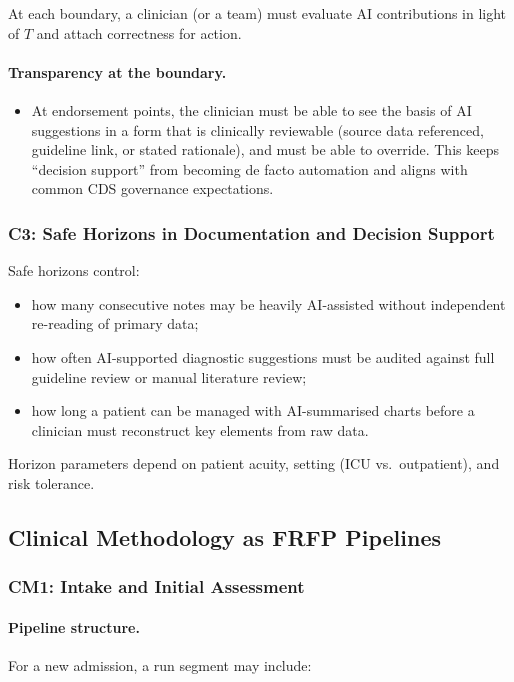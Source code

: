 At each boundary, a clinician (or a team) must evaluate AI contributions in
light of $T$ and attach correctness for action.
\paragraph{Transparency at the boundary.}
\begin{itemize}
  \item At endorsement points, the clinician must be able to see the basis of AI suggestions in a form that is
        clinically reviewable (source data referenced, guideline link, or stated rationale), and must be able to
        override. This keeps “decision support” from becoming de facto automation and aligns with common CDS governance
        expectations.
\end{itemize}
\subsubsection*{C3: Safe Horizons in Documentation and Decision Support}

Safe horizons control:

\begin{itemize}
  \item how many consecutive notes may be heavily AI-assisted without
        independent re-reading of primary data;
  \item how often AI-supported diagnostic suggestions must be audited against
        full guideline review or manual literature review;
  \item how long a patient can be managed with AI-summarised charts before
        a clinician must reconstruct key elements from raw data.
\end{itemize}

Horizon parameters depend on patient acuity, setting (ICU vs.\ outpatient),
and risk tolerance.

\subsection{Clinical Methodology as FRFP Pipelines}

\subsubsection*{CM1: Intake and Initial Assessment}

\paragraph{Pipeline structure.}
For a new admission, a run segment may include:

